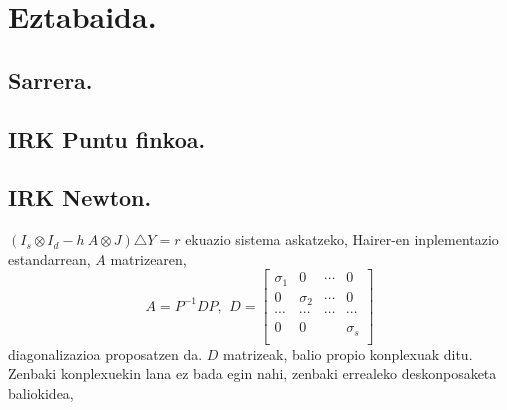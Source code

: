 \chapter{Eztabaida.}

\section{Sarrera.}

\section{IRK Puntu finkoa.}

\section{IRK Newton.}

$(I_s \otimes I_d - h \ A \otimes J) \triangle Y = r$ ekuazio sistema askatzeko, Hairer-en inplementazio estandarrean, $A$ matrizearen,
\begin{equation*}
A=P^{-1}DP, \ \,
D=\begin{bmatrix}
\sigma_1 & 0            & \cdots & 0  \\
 0       & \sigma_2     & \cdots & 0   \\
 \cdots  & \cdots       & \cdots & \cdots  \\
 0       &  0           &        & \sigma_s \\
\end{bmatrix}
\end{equation*}
diagonalizazioa proposatzen da. $D$ matrizeak, balio propio konplexuak ditu. Zenbaki konplexuekin lana ez bada egin nahi, zenbaki errealeko deskonposaketa baliokidea,

